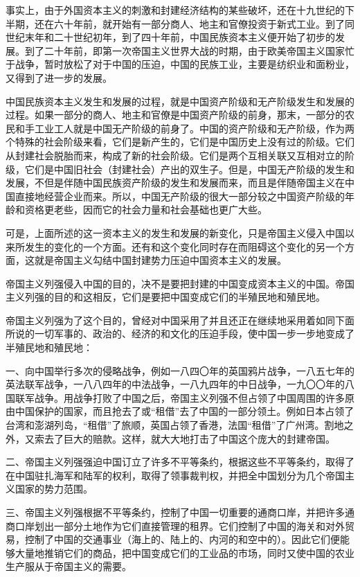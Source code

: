 事实上，由于外国资本主义的刺激和封建经济结构的某些破坏，还在十九世纪的下半期，还在六十年前，就开始有一部分商人、地主和官僚投资于新式工业。到了同世纪末年和二十世纪初年，到了四十年前，中国民族资本主义便开始了初步的发展。到了二十年前，即第一次帝国主义世界大战的时期，由于欧美帝国主义国家忙于战争，暂时放松了对于中国的压迫，中国的民族工业，主要是纺织业和面粉业，又得到了进一步的发展。

中国民族资本主义发生和发展的过程，就是中国资产阶级和无产阶级发生和发展的过程。如果一部分的商人、地主和官僚是中国资产阶级的前身，那末，一部分的农民和手工业工人就是中国无产阶级的前身了。中国的资产阶级和无产阶级，作为两个特殊的社会阶级来看，它们是新产生的，它们是中国历史上没有过的阶级。它们从封建社会脱胎而来，构成了新的社会阶级。它们是两个互相关联又互相对立的阶级，它们是中国旧社会（封建社会）产出的双生子。但是，中国无产阶级的发生和发展，不但是伴随中国民族资产阶级的发生和发展而来，而且是伴随帝国主义在中国直接地经营企业而来。所以，中国无产阶级的很大一部分较之中国资产阶级的年龄和资格更老些，因而它的社会力量和社会基础也更广大些。

可是，上面所述的这一资本主义的发生和发展的新变化，只是帝国主义侵入中国以来所发生的变化的一个方面。还有和这个变化同时存在而阻碍这个变化的另一个方面，这就是帝国主义勾结中国封建势力压迫中国资本主义的发展。

帝国主义列强侵入中国的目的，决不是要把封建的中国变成资本主义的中国。帝国主义列强的目的和这相反，它们是要把中国变成它们的半殖民地和殖民地。

帝国主义列强为了这个目的，曾经对中国采用了并且还正在继续地采用着如同下面所说的一切军事的、政治的、经济的和文化的压迫手段，使中国一步一步地变成了半殖民地和殖民地：

一、向中国举行多次的侵略战争，例如一八四〇年的英国鸦片战争，一八五七年的英法联军战争，一八八四年的中法战争，一八九四年的中日战争，一九〇〇年的八国联军战争。用战争打败了中国之后，帝国主义列强不但占领了中国周围的许多原由中国保护的国家，而且抢去了或“租借”去了中国的一部分领土。例如日本占领了台湾和澎湖列岛，“租借”了旅顺，英国占领了香港，法国“租借”了广州湾。割地之外，又索去了巨大的赔款。这样，就大大地打击了中国这个庞大的封建帝国。

二、帝国主义列强强迫中国订立了许多不平等条约，根据这些不平等条约，取得了在中国驻扎海军和陆军的权利，取得了领事裁判权，并把全中国划分为几个帝国主义国家的势力范围。

三、帝国主义列强根据不平等条约，控制了中国一切重要的通商口岸，并把许多通商口岸划出一部分土地作为它们直接管理的租界。它们控制了中国的海关和对外贸易，控制了中国的交通事业（海上的、陆上的、内河的和空中的）。因此它们便能够大量地推销它们的商品，把中国变成它们的工业品的市场，同时又使中国的农业生产服从于帝国主义的需要。


